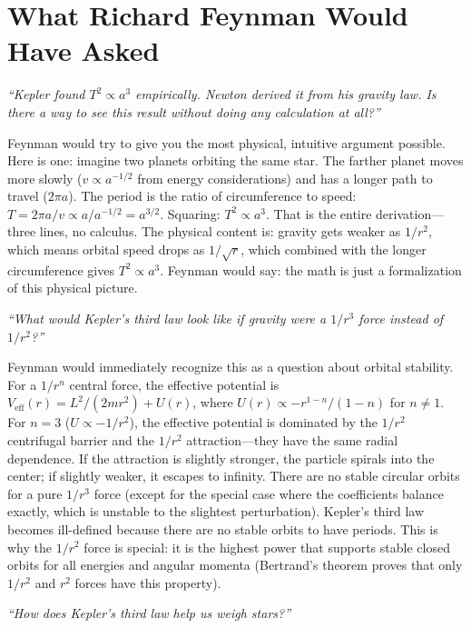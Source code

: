 \section*{What Richard Feynman Would Have Asked}

\textit{``Kepler found $T^2 \propto a^3$ empirically. Newton derived it from his gravity law. Is there a way to see this result without doing any calculation at all?''}

Feynman would try to give you the most physical, intuitive argument possible. Here is one: imagine two planets orbiting the same star. The farther planet moves more slowly ($v \propto a^{-1/2}$ from energy considerations) and has a longer path to travel ($2\pi a$). The period is the ratio of circumference to speed: $T = 2\pi a/v \propto a/a^{-1/2} = a^{3/2}$. Squaring: $T^2 \propto a^3$. That is the entire derivation---three lines, no calculus. The physical content is: gravity gets weaker as $1/r^2$, which means orbital speed drops as $1/\sqrt{r}$, which combined with the longer circumference gives $T^2 \propto a^3$. Feynman would say: the math is just a formalization of this physical picture.

\textit{``What would Kepler's third law look like if gravity were a $1/r^3$ force instead of $1/r^2$?''}

Feynman would immediately recognize this as a question about orbital stability. For a $1/r^n$ central force, the effective potential is $V_{\text{eff}}(r) = L^2/(2mr^2) + U(r)$, where $U(r) \propto -r^{1-n}/(1-n)$ for $n\neq 1$. For $n = 3$ ($U \propto -1/r^2$), the effective potential is dominated by the $1/r^2$ centrifugal barrier and the $1/r^2$ attraction---they have the same radial dependence. If the attraction is slightly stronger, the particle spirals into the center; if slightly weaker, it escapes to infinity. There are no stable circular orbits for a pure $1/r^3$ force (except for the special case where the coefficients balance exactly, which is unstable to the slightest perturbation). Kepler's third law becomes ill-defined because there are no stable orbits to have periods. This is why the $1/r^2$ force is special: it is the highest power that supports stable closed orbits for all energies and angular momenta (Bertrand's theorem proves that only $1/r^2$ and $r^2$ forces have this property).

\textit{``How does Kepler's third law help us weigh stars?''}

